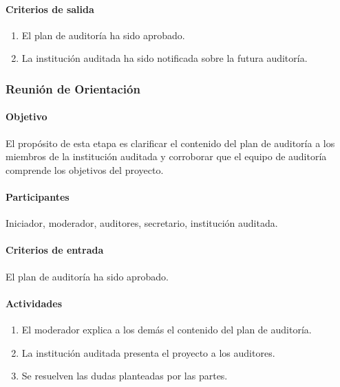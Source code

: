 \paragraph{Criterios de salida}

\begin{enumerate}
	\item
		El plan de auditoría ha sido aprobado.
	\item
		La institución auditada ha sido notificada sobre la futura auditoría.
\end{enumerate}

\subsubsection{Reunión de Orientación}

\paragraph{Objetivo\\}

El propósito de esta etapa es clarificar el contenido del plan de auditoría a los miembros de la institución auditada y corroborar que el equipo de auditoría comprende los objetivos del proyecto.

\paragraph{Participantes\\}

Iniciador, moderador, auditores, secretario, institución auditada.

\paragraph{Criterios de entrada\\}

El plan de auditoría ha sido aprobado.

\paragraph{Actividades}

\begin{enumerate}
	\item
		El moderador explica a los demás el contenido del plan de auditoría.
	\item
		La institución auditada presenta el proyecto a los auditores.
	\item
		Se resuelven las dudas planteadas por las partes.
\end{enumerate}

